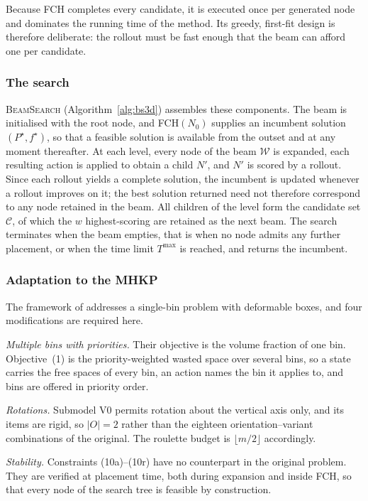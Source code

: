 Because \textsc{FCH} completes every candidate, it is executed once per
generated node and dominates the running time of the method. Its greedy,
first-fit design is therefore deliberate: the rollout must be fast enough that
the beam can afford one per candidate.

\subsubsection{The search}

\textsc{BeamSearch} (Algorithm~\ref{alg:bs3d}) assembles these components. The
beam is initialised with the root node, and \textsc{FCH}$(N_0)$ supplies an
incumbent solution $(P^\star, f^\star)$, so that a feasible solution is
available from the outset and at any moment thereafter. At each level, every
node of the beam $\mathcal{W}$ is expanded, each resulting action is applied to
obtain a child $N'$, and $N'$ is scored by a rollout. Since each rollout yields
a complete solution, the incumbent is updated whenever a rollout improves on
it; the best solution returned need not therefore correspond to any node
retained in the beam. All children of the level form the candidate set
$\mathcal{C}$, of which the $w$ highest-scoring are retained as the next beam.
The search terminates when the beam empties, that is when no node admits any
further placement, or when the time limit $T^{\max}$ is reached, and returns
the incumbent.

\subsubsection{Adaptation to the MHKP}
\label{sec:bs-adapt}

The framework of \citet{xu2026} addresses a single-bin problem with deformable
boxes, and four modifications are required here.

\emph{Multiple bins with priorities.} Their objective is the volume fraction of
one bin. Objective~(1) is the priority-weighted wasted space over several bins,
so a state carries the free spaces of every bin, an action names the bin it
applies to, and bins are offered in priority order.

\emph{Rotations.} Submodel V0 permits rotation about the vertical axis only,
and its items are rigid, so $|O| = 2$ rather than the eighteen
orientation--variant combinations of the original. The roulette budget is
$\lfloor m/2 \rfloor$ accordingly.

\emph{Stability.} Constraints (10a)--(10r) have no counterpart in the original
problem. They are verified at placement time, both during expansion and inside
\textsc{FCH}, so that every node of the search tree is feasible by
construction.

